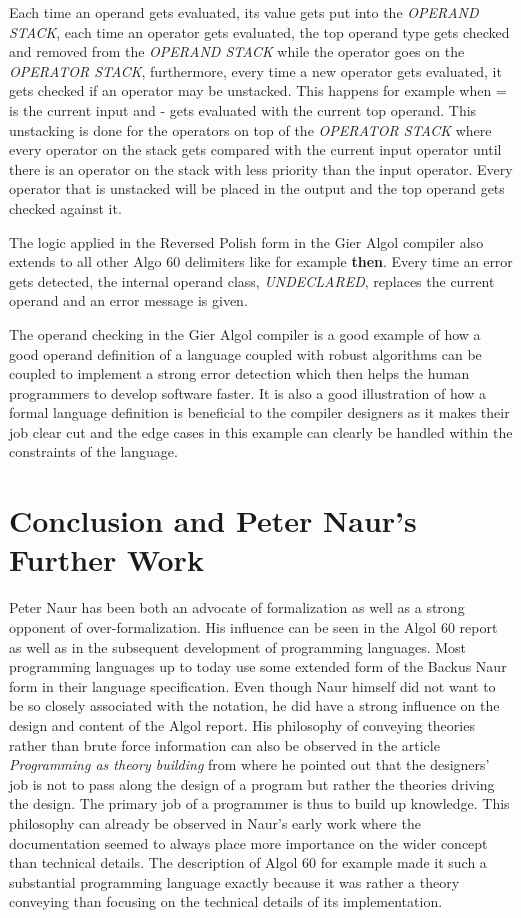 \documentclass{article}
\begin{document}
Each time an operand gets evaluated, its value gets put into the \textit{OPERAND STACK}, each time an operator gets evaluated, the top operand type gets checked and removed from the \textit{OPERAND STACK} while the operator goes on the \textit{OPERATOR STACK}, furthermore, every time a new operator gets evaluated, it gets checked if an operator may be unstacked. This happens for example when = is the current input and - gets evaluated with the current top operand. This unstacking is done for the operators on top of the \textit{OPERATOR STACK} where every operator on the stack gets compared with the current input operator until there is an operator on the stack with less priority than the input operator. Every operator that is unstacked will be placed in the output and the top operand gets checked against it.

The logic applied in the Reversed Polish form in the Gier Algol compiler also extends to all other Algo 60 delimiters like for example \textbf{then}. Every time an error gets detected, the internal operand class, \textit{UNDECLARED}, replaces the current operand and an error message is given.

The operand checking in the Gier Algol compiler is a good example of how a good operand definition of a language coupled with robust algorithms can be coupled to implement a strong error detection which then helps the human programmers to develop software faster. It is also a good illustration of how a formal language definition is beneficial to the compiler designers as it makes their job clear cut and the edge cases in this example can clearly be handled within the constraints of the language.
\newpage
\section{Conclusion and Peter Naur's Further Work}
Peter Naur has been both an advocate of formalization as well as a strong opponent of over-formalization. His influence can be seen in the Algol 60 report as well as in the subsequent development of programming languages. Most programming languages up to today use some extended form of the Backus Naur form in their language specification. Even though Naur himself did not want to be so closely associated with the notation, he did have a strong influence on the design and content of the Algol report. His philosophy of conveying theories rather than brute force information can also be observed in the article \textit{Programming as theory building} from \cite{naur1985programming} where he pointed out that the designers' job is not to pass along the design of a program but rather the theories driving the design. The primary job of a programmer is thus to build up knowledge. This philosophy can already be observed in Naur's early work where the documentation seemed to always place more importance on the wider concept than technical details. The description of Algol 60 for example made it such a substantial programming language exactly because it was rather a theory conveying than focusing on the technical details of its implementation.
\end{document}
